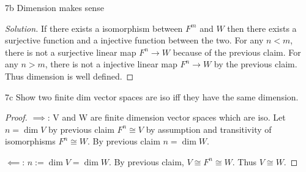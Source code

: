 \documentclass{article}
\newenvironment{solution}
{\renewcommand\qedsymbol{$\blacksquare$}\begin{proof}[Solution]}
{\end{proof}}
\begin{document}
\begin{claim}{7b}\label{Claim 7b.}
    Dimension makes sense
\end{claim}
\begin{solution}
    If there exists a isomorphism between $F^m$ and $W$ then there exists a surjective function and a injective function between the two. For any $n < m$, there is not a surjective linear map $F^n \to W$ because of the previous claim. For any $n > m$, there is not a injective linear map $F^n \to W$ by the previous claim. Thus dimension is well defined.
\end{solution}

\begin{claim}{7c}\label{Claim 7c.}
    Show two finite dim vector spaces are iso iff they have the same dimension.
\end{claim}
\begin{proof}
    $\implies$: V and W are finite dimension vector spaces which are iso. Let $n = \dim V$ by previous claim $F^n \cong V$ by assumption and transitivity of isomorphisms $F^n \cong W$. By previous claim $n = \dim W$.

    $\impliedby$: $n := \dim V = \dim W$. By previous claim, $V \cong F^n \cong W$. Thus $V \cong W$.
\end{proof}

\bigskip

    
\end{document}
